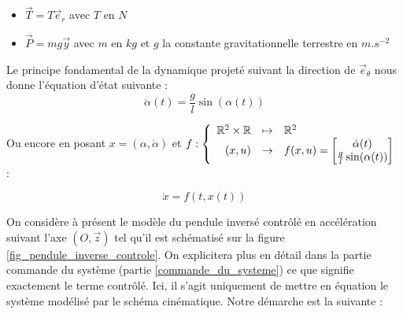 \documentclass[a4paper]{article}
\begin{document}
                                \begin{itemize}
                                        \item $\overrightarrow{T}=T\vec{e}_r$ avec $T$ en $N$
                                        \item $\overrightarrow{P}=mg\vec{y}$ avec $m$ en $kg$ et $g$ la constante gravitationnelle terrestre en $m.s^{-2}$
                                \end{itemize}
                                Le principe fondamental de la dynamique projeté suivant la direction de $\vec{e}_\theta$ nous donne l'équation d'état suivante : 
                                \begin{equation}
                                        \ddot \alpha (t) = \frac{g}{l} \sin (\alpha (t))
                                        \label{eq1}
                                \end{equation}

                                Ou encore en posant $x=(\alpha, \dot \alpha)$ et $f : \vspace{15pt} \left\{
                                \begin{array}{rcl}
                                        \mathbb{R}^2 \times \mathbb{R} & \mapsto & \mathbb{R}^2 \\
                                        (x,u) & \to & f(x,u) = \begin{bmatrix} \dot \alpha (t)\\ \frac{g}{l} \sin (\alpha (t)) \end{bmatrix}
                                \end{array} \right.$ :

                                \begin{equation}
                                        \dot x = f(t,x(t))
                                        \label{eq2}
                                \end{equation}
                                \vspace{5pt}

                                On considère à présent le modèle du pendule inversé contrôlé en accélération suivant l'axe $(O,\vec{z})$
                                tel qu'il est schématisé sur la figure \ref{fig_pendule_inverse_controle}.
                                On explicitera plus en détail dans la partie commande du système (partie \ref{commande_du_systeme}) ce que signifie
                                exactement le terme contrôlé. Ici, il s'agit uniquement de mettre en équation le système modélisé par le schéma cinématique.
                                Notre démarche est la suivante : \\
\end{document}
